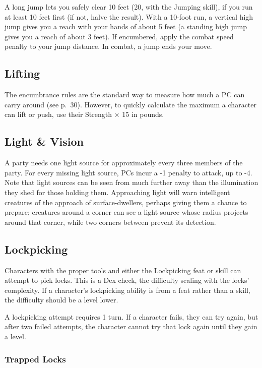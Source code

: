 \documentclass{article}
\begin{document}
\begin{multicols}{2}
A long jump lets you safely clear 10 feet (20, with the Jumping skill),
if you run at least 10 feet first (if not, halve the result). With a
10-foot run, a vertical high jump gives you a reach with your hands of
about 5 feet (a standing high jump gives you a reach of about 3 feet).
If encumbered, apply the combat speed penalty to your jump distance. In
combat, a jump ends your move.

\subsection{Lifting}\label{lifting}

The encumbrance rules are the standard way to measure how much a PC can
carry around (see p.~30). However, to quickly calculate the maximum a
character can lift or push, use their Strength × 15 in pounds.

\subsection{Light \& Vision}\label{light-vision}

A party needs one light source for approximately every three members of
the party. For every missing light source, PCs incur a -1 penalty to
attack, up to -4. Note that light sources can be seen from much further
away than the illumination they shed for those holding them. Approaching
light will warn intelligent creatures of the approach of
surface-dwellers, perhaps giving them a chance to prepare; creatures
around a corner can see a light source whose radius projects around that
corner, while two corners between prevent its detection.

\subsection{Lockpicking}\label{lockpicking}

Characters with the proper tools and either the Lockpicking feat or
skill can attempt to pick locks. This is a Dex check, the difficulty
scaling with the locks' complexity. If a character's lockpicking ability
is from a feat rather than a skill, the difficulty should be a level
lower.

A lockpicking attempt requires 1 turn. If a character fails, they can
try again, but after two failed attempts, the character cannot try that
lock again until they gain a level.

\subsubsection{Trapped Locks}\label{trapped-locks}


\end{multicols}
\end{document}

